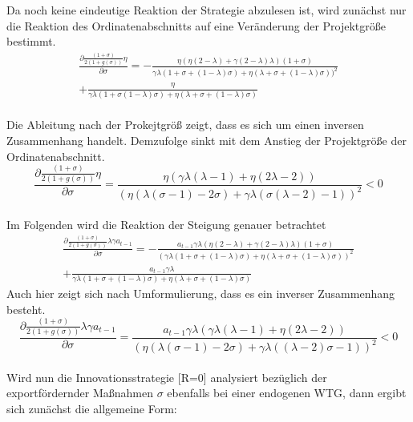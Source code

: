 Da noch keine eindeutige Reaktion der Strategie abzulesen ist, wird zunächst nur die Reaktion des Ordinatenabschnitts auf eine Veränderung der Projektgrö{\ss}e bestimmt. 
\begin{equation}
\begin{split}
\frac{\partial{\frac{(1+\sigma)}{2(1+g(\sigma))}\eta}}{\partial\sigma}=-\frac{\eta(\eta(2-\lambda)+\gamma(2-\lambda)\lambda)(1+\sigma)}{\gamma\lambda(1+\sigma+(1-\lambda)\sigma)+\eta(\lambda+\sigma+(1-\lambda)\sigma))^2}\\
+\frac{\eta}{\gamma\lambda(1+\sigma(1-\lambda)\sigma)+\eta(\lambda+\sigma+(1-\lambda)\sigma)}
\end{split}
\end{equation}
\\
Die Ableitung nach der Prokejtgrö{\ss} zeigt, dass es sich um einen inversen Zusammenhang handelt. Demzufolge sinkt mit dem Anstieg der Projektgrö{\ss}e der Ordinatenabschnitt.
\begin{equation}
\frac{\partial{\frac{(1+\sigma)}{2(1+g(\sigma))}\eta}}{\partial{\sigma}}=\frac{\eta(\gamma\lambda(\lambda-1)+\eta(2\lambda-2))}{(\eta(\lambda(\sigma-1)-2\sigma)+\gamma\lambda(\sigma(\lambda-2)-1))^2}<0
\end{equation}
\\
Im Folgenden wird die Reaktion der Steigung genauer betrachtet 
\begin{equation}
\begin{split}
\frac{\partial{\frac{(1+\sigma)}{2(1+g(\sigma))}\lambda\gamma a_{t-1}}}{\partial\sigma}=-\frac{a_{t-1}\gamma\lambda(\eta(2-\lambda)+\gamma(2-\lambda)\lambda)(1+\sigma)}{(\gamma\lambda(1+\sigma+(1-\lambda)\sigma)+\eta(\lambda+\sigma+(1-\lambda)\sigma))^2}\\
+\frac{a_{t-1}\gamma\lambda}{\gamma\lambda(1+\sigma+(1-\lambda)\sigma)+\eta(\lambda+\sigma+(1-\lambda)\sigma)}
\end{split}
\end{equation}
Auch hier zeigt sich nach Umformulierung, dass es ein inverser Zusammenhang besteht. 
\begin{equation}
\frac{\partial{\frac{(1+\sigma)}{2(1+g(\sigma))}\lambda\gamma a_{t-1}}}{\partial\sigma}=\frac{a_{t-1}\gamma\lambda(\gamma\lambda(\lambda-1)+\eta(2\lambda-2))}{(\eta(\lambda(\sigma-1)-2\sigma)+\gamma\lambda((\lambda-2)\sigma-1))^2}<0
\end{equation}
\\
Wird nun die Innovationsstrategie [R=0] analysiert bezüglich der exportfördernder Ma{\ss}nahmen $\sigma$ ebenfalls bei einer endogenen WTG, dann ergibt sich zunächst die allgemeine Form: 
